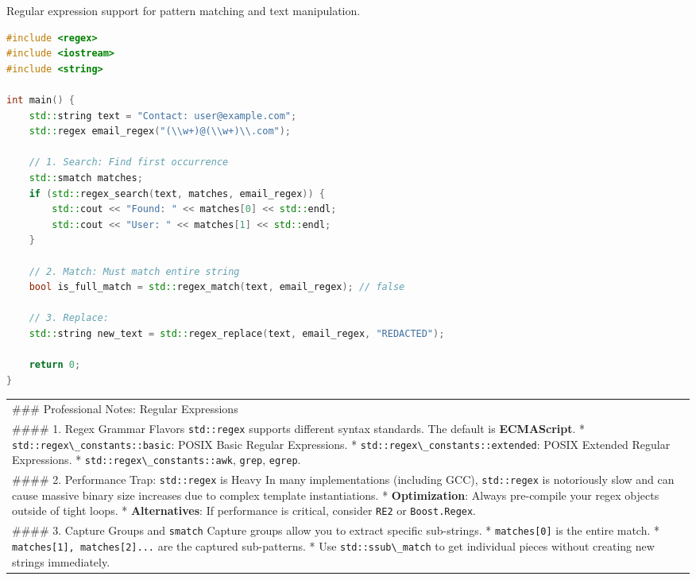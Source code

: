 Regular expression support for pattern matching and text manipulation.

\begin{lstlisting}[language={C++}]
#include <regex>
#include <iostream>
#include <string>

int main() {
    std::string text = "Contact: user@example.com";
    std::regex email_regex("(\\w+)@(\\w+)\\.com");
    
    // 1. Search: Find first occurrence
    std::smatch matches;
    if (std::regex_search(text, matches, email_regex)) {
        std::cout << "Found: " << matches[0] << std::endl;
        std::cout << "User: " << matches[1] << std::endl;
    }
    
    // 2. Match: Must match entire string
    bool is_full_match = std::regex_match(text, email_regex); // false
    
    // 3. Replace:
    std::string new_text = std::regex_replace(text, email_regex, "REDACTED");
    
    return 0;
}
\end{lstlisting}

\begin{longtable}[]{@{}
  >{\raggedright\arraybackslash}p{}@{}}
\toprule
\endhead
\#\#\# Professional Notes: Regular Expressions \\
\#\#\#\# 1. Regex Grammar Flavors \passthrough{\lstinline!std::regex!}
supports different syntax standards. The default is \textbf{ECMAScript}.
* \passthrough{\lstinline!std::regex\_constants::basic!}: POSIX Basic
Regular Expressions. *
\passthrough{\lstinline!std::regex\_constants::extended!}: POSIX
Extended Regular Expressions. *
\passthrough{\lstinline!std::regex\_constants::awk!},
\passthrough{\lstinline!grep!}, \passthrough{\lstinline!egrep!}. \\
\#\#\#\# 2. Performance Trap: \passthrough{\lstinline!std::regex!} is
Heavy In many implementations (including GCC),
\passthrough{\lstinline!std::regex!} is notoriously slow and can cause
massive binary size increases due to complex template instantiations. *
\textbf{Optimization}: Always pre-compile your regex objects outside of
tight loops. * \textbf{Alternatives}: If performance is critical,
consider \passthrough{\lstinline!RE2!} or
\passthrough{\lstinline!Boost.Regex!}. \\
\#\#\#\# 3. Capture Groups and \passthrough{\lstinline!smatch!} Capture
groups allow you to extract specific sub-strings. *
\passthrough{\lstinline!matches[0]!} is the entire match. *
\passthrough{\lstinline!matches[1], matches[2]...!} are the captured
sub-patterns. * Use \passthrough{\lstinline!std::ssub\_match!} to get
individual pieces without creating new strings immediately. \\
\bottomrule
\end{longtable}


